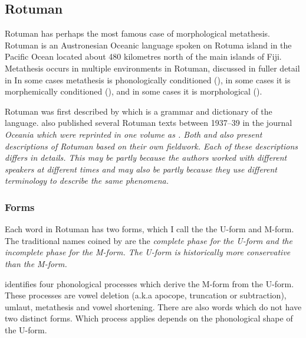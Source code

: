 \subsection{Rotuman}\label{sec:Rot}
Rotuman has perhaps the most famous case of morphological metathesis.
Rotuman is an Austronesian Oceanic language spoken on Rotuma island
in the Pacific Ocean located about 480 kilometres north of the main islands of Fiji.
Metathesis occurs in multiple environments in Rotuman,
discussed in fuller detail in 
In some cases metathesis is phonologically conditioned (),
in some cases it is morphemically conditioned (),
and in some cases it is morphological ().

Rotuman was first described by \citet{ch40} which is a grammar and dictionary of the language.
\citeauthor{ch39} also published several Rotuman texts between 1937--39 in the journal \it{Oceania}
which were reprinted in one volume as \citet{ch39}.
Both \citet{be87} and \citet{va02} also present descriptions of
Rotuman based on their own fieldwork.
Each of these descriptions differs in details.
This may be partly because the authors worked with different
speakers at different times and may also be partly because they use
different terminology to describe the same phenomena.

\subsubsection{Forms}\label{sec:RotFor}
Each word in Rotuman has two forms, which I call the the U-form and M-form.
The traditional names coined by \cite{ch40} are the \it{complete phase} for the U-form
and the \it{incomplete phase} for the M-form.
The U-form is historically more conservative than the M-form.

\cite{ch40} identifies four phonological processes
which derive the M-form from the U-form.
These processes are vowel deletion (a.k.a apocope, truncation or subtraction),
umlaut, metathesis and vowel shortening.
There are also words which do not have two distinct forms.
Which process applies depends on the phonological shape of the U-form.


